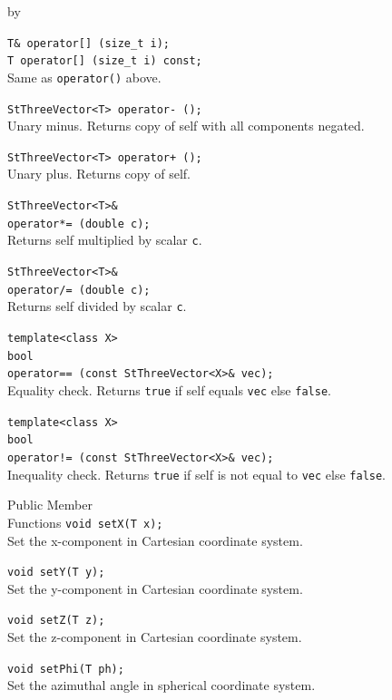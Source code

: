 \documentclass[twoside]{article}
\newcommand{\comp}[1]{\texttt{#1}}%
\newcommand{\entrylabel}[1]{\mbox{\textbf{{#1}}}\hfil}%
\newenvironment{entry}
{\begin{list}{}%
    {\renewcommand{\makelabel}{\entrylabel}%
     \setlength{\labelwidth}{90pt}%
     \setlength{\leftmargin}{\labelwidth}
     \advance\leftmargin by \labelsep%
      }%
    }%
  {\end{list}}
\newcommand{\Entrylabel}[1]%
{\raisebox{0pt}[1ex][0pt]{\makebox[\labelwidth][l]%
    {\parbox[t]{\labelwidth}{\hspace{0pt}\textbf{{#1}}}}}}
\newenvironment{Entry}%
{\renewcommand{\entrylabel}{\Entrylabel}\begin{entry}}%
  {\end{entry}}
\begin{document}
\begin{description}
\begin{Entry}
    \verb+T& operator[] (size_t i);+\\
    \verb+T operator[] (size_t i) const;+\\
    Same as \comp{operator()} above.

    \verb+StThreeVector<T> operator- ();+\\
    Unary minus. Returns copy of self with all components negated.
    
    \verb#StThreeVector<T> operator+ ();#\\
    Unary plus. Returns copy of self.
    
    \verb+StThreeVector<T>&+\\
    \verb+operator*= (double c);+\\
    Returns self multiplied by scalar \comp{c}.
    
    \verb+StThreeVector<T>&+\\
    \verb+operator/= (double c);+\\
    Returns self divided by scalar \comp{c}.
    
    \verb+template<class X>+\\
    \verb+bool+\\
    \verb+operator== (const StThreeVector<X>& vec);+\\
    Equality check. Returns \comp{true} if self equals
    \comp{vec} else \comp{false}.
    
    \verb+template<class X>+\\
    \verb+bool+\\
    \verb+operator!= (const StThreeVector<X>& vec);+\\
    Inequality check. Returns \comp{true} if self is not equal to
    \comp{vec} else \comp{false}.
    

\item[Public Member\\ Functions]
    \verb+void setX(T x);+\\
    Set the x-component in Cartesian coordinate system.
    
    \verb+void setY(T y);+\\
    Set the y-component in Cartesian coordinate system.
    
    \verb+void setZ(T z);+\\
    Set the z-component in Cartesian coordinate system.

    \verb+void setPhi(T ph);+\\
    Set the azimuthal angle in spherical coordinate system.


\end{Entry}
\end{description}
\end{document}
